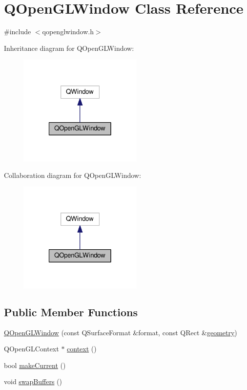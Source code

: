 \hypertarget{classQOpenGLWindow}{\section{Q\-Open\-G\-L\-Window Class Reference}
\label{classQOpenGLWindow}
}


{\ttfamily \#include $<$qopenglwindow.\-h$>$}



Inheritance diagram for Q\-Open\-G\-L\-Window\-:
\nopagebreak
\begin{figure}[H]
\begin{center}
\leavevmode
\includegraphics[width=174pt]{classQOpenGLWindow__inherit__graph}
\end{center}
\end{figure}


Collaboration diagram for Q\-Open\-G\-L\-Window\-:
\nopagebreak
\begin{figure}[H]
\begin{center}
\leavevmode
\includegraphics[width=174pt]{classQOpenGLWindow__coll__graph}
\end{center}
\end{figure}
\subsection*{Public Member Functions}
\begin{DoxyCompactItemize}
\item 
\hyperlink{classQOpenGLWindow_a45d1b287e72113aaa653e8e937ebdfd6}{Q\-Open\-G\-L\-Window} (const Q\-Surface\-Format \&format, const Q\-Rect \&\hyperlink{structgeometry}{geometry})
\item 
Q\-Open\-G\-L\-Context $\ast$ \hyperlink{classQOpenGLWindow_ac50866b8a1e723bccea33df6c5a3d1b3}{context} ()
\item 
bool \hyperlink{classQOpenGLWindow_af7602ba08fd50ee8fb9ccbed2d121404}{make\-Current} ()
\item 
void \hyperlink{classQOpenGLWindow_ae8b962ff83b505543adfcd52f4fb203b}{swap\-Buffers} ()
\end{DoxyCompactItemize}
